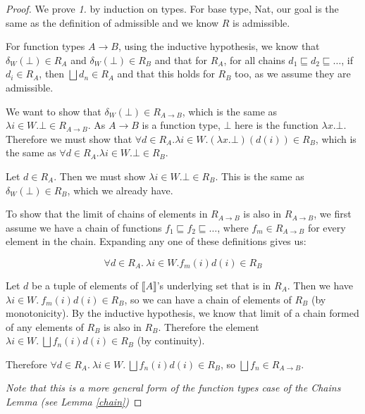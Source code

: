\begin{proof}
We prove \emph{1.} by induction on types. For base type, Nat, our goal is the same as the definition of admissible and we know $R$ is admissible. 

For function types $A \to B$, using the inductive hypothesis, we know that $\delta_W(\bot) \in R_A$ and $\delta_W(\bot) \in R_B$ and that for $R_A$, for all chains $d_1 \sqsubseteq d_2 \sqsubseteq \dots$, if  $d_i \in R_A$, then $\bigsqcup d_n \in R_A$ and that this holds for $R_B$ too, as we assume they are admissible. 

We want to show that $\delta_W(\bot) \in R_{A \to B}$, which is the same as $\lambda i \in W. \bot \in R_{A \to B}$. As $A \to B$ is a function type, $\bot$ here is the function $\lambda x. \bot$. Therefore we must show that $\forall d \in R_A. \lambda i \in W. (\lambda x. \bot)(d(i)) \in R_B$, which is the same as $\forall d \in R_A. \lambda i \in W. \bot \in R_B$.

Let $d \in R_A$. Then we must show $\lambda i \in W. \bot \in R_B$. This is the same as $\delta_W(\bot) \in R_B$, which we already have.

\vspace{0.5cm}

To show that the limit of chains of elements in  $R_{A \to B}$ is also in $R_{A \to B}$, we first assume we have a chain of functions $f_1 \sqsubseteq f_2 \sqsubseteq \dots$, where $f_m \in R_{A \to B}$ for every element in the chain. Expanding any one of these definitions gives us:

\[ \forall d \in R_A. \ \lambda i \in W. f_m(i)d(i) \in R_B\]

Let $d$ be a tuple of elements of $\llbracket A \rrbracket$'s underlying set that is in $R_A$. Then we have $\lambda i \in W. \ f_m(i)d(i) \in R_B$, so we can have a chain of elements of $R_B$ (by monotonicity). By the inductive hypothesis, we know that limit of a chain formed of  any elements of $R_B$ is also in $R_B$. Therefore the element $\lambda i \in W. \ \bigsqcup f_n(i)d(i) \in R_B$ (by continuity).

Therefore $\forall d \in R_A. \ \lambda i \in W. \ \bigsqcup f_n(i)d(i) \in R_B$, so $\bigsqcup f_n \in R_{A \to B}$.

\emph{Note that this is a more general form of the function types case of the Chains Lemma (see Lemma \ref{chain})}

\vspace{0.5cm}


 
\end{proof}

